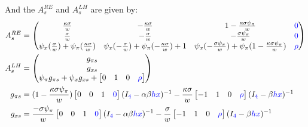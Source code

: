 \documentclass[11pt]{article}
\renewcommand{\[}{\begin{equation}}
\renewcommand{\]}{\end{equation}}
\begin{document}
And the $A^{RE}_s$ and $A^{LH}_s$ are given by:
\begin{align}
A_s^{RE} &= \begin{pmatrix}   \frac{\kappa\sigma}{w}  &-\frac{\kappa\sigma}{w}  & 1-\frac{\kappa\sigma\psi_{\pi}}{w} & \textcolor{blue}{0}\\
 \frac{ \sigma}{w} &  -\frac{\sigma}{w} & -\frac{\sigma\psi_{\pi}}{w} & \textcolor{blue}{0}\\ 
 \psi_x( \frac{\sigma}{w}) + \psi_{\pi}( \frac{\kappa\sigma}{w}) & \psi_x(- \frac{\sigma}{w}) + \psi_{\pi}(- \frac{\kappa\sigma}{w}) +1 &  \psi_x(-\frac{\sigma\psi_{\pi}}{w}) + \psi_{\pi}( 1-\frac{\kappa\sigma\psi_{\pi}}{w}) & \textcolor{blue}{\rho}\end{pmatrix}  
\\
 A_s^{LH} & = \begin{pmatrix} g_{\pi s} \\ g_{x s} \\ \psi_{\pi}g_{\pi s} + \psi_xg_{x s} + \begin{bmatrix} 0 & 1& 0 & \textcolor{blue}{\rho}\end{bmatrix}
\end{pmatrix} \\
g_{\pi s} & = (1-\frac{\kappa\sigma\psi_{\pi}}{w} )\begin{bmatrix} 0&0&1 & \textcolor{blue}{0}\end{bmatrix} (I_{\textcolor{blue}{4}} - \alpha\beta \textcolor{blue}{hx})^{-1} -\frac{\kappa\sigma}{w}\begin{bmatrix} -1&1&0 & \textcolor{blue}{\rho} \end{bmatrix} (I_{\textcolor{blue}{4}} -\beta \textcolor{blue}{hx})^{-1}\\
g_{x s} & =  \frac{-\sigma\psi_{\pi}}{w} \begin{bmatrix} 0&0&1& \textcolor{blue}{0} \end{bmatrix}(I_{\textcolor{blue}{4}} - \alpha\beta \textcolor{blue}{hx})^{-1}  -\frac{\sigma}{w}\begin{bmatrix} -1&1&0 & \textcolor{blue}{\rho}\end{bmatrix}(I_{\textcolor{blue}{4}} -\beta \textcolor{blue}{hx})^{-1}
\end{align}
\end{document}
